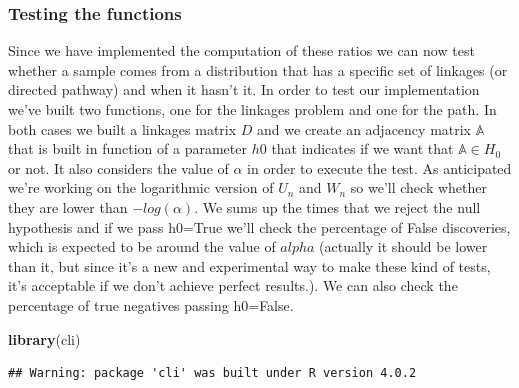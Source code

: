 \documentclass[
]{article}
\newenvironment{Shaded}{\begin{snugshade}}{\end{snugshade}}
\newcommand{\KeywordTok}[1]{\textcolor[rgb]{0.13,0.29,0.53}{\textbf{#1}}}
\newcommand{\NormalTok}[1]{#1}
\begin{document}
\hypertarget{testing-the-functions}{%
\subsubsection{Testing the functions}\label{testing-the-functions}}

Since we have implemented the computation of these ratios we can now
test whether a sample comes from a distribution that has a specific set
of linkages (or directed pathway) and when it hasn't it. In order to
test our implementation we've built two functions, one for the linkages
problem and one for the path. In both cases we built a linkages matrix
\(D\) and we create an adjacency matrix \(\mathbb{A}\) that is built in
function of a parameter \(h0\) that indicates if we want that
\(\mathbb{A} \in H_0\) or not. It also considers the value of \(\alpha\)
in order to execute the test. As anticipated we're working on the
logarithmic version of \(U_n\) and \(W_n\) so we'll check whether they
are lower than \(-log(\alpha)\). We sums up the times that we reject the
null hypothesis and if we pass h0=True we'll check the percentage of
False discoveries, which is expected to be around the value of \(alpha\)
(actually it should be lower than it, but since it's a new and
experimental way to make these kind of tests, it's acceptable if we
don't achieve perfect results.). We can also check the percentage of
true negatives passing h0=False.

\begin{Shaded}
\begin{Highlighting}[]
\KeywordTok{library}\NormalTok{(cli)}
\end{Highlighting}
\end{Shaded}

\begin{verbatim}
## Warning: package 'cli' was built under R version 4.0.2
\end{verbatim}
\end{document}
